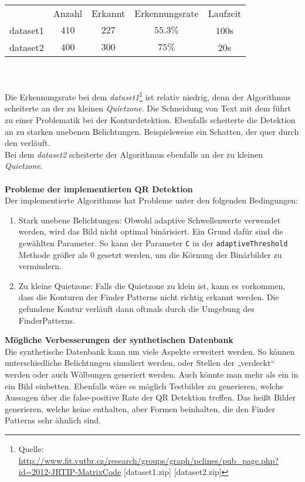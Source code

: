 \begin{tabular}{l c c c c}
 		& Anzahl & Erkannt & Erkennungsrate & Laufzeit \\
		dataset1 & $410$ & $227$ & $55.3\%$ & $100$s \\
		dataset2 & $400$ & $300$ & $75\%$ & $20$s \\
\end{tabular}
\\ \\
Die Erkennungsrate bei dem \emph{dataset1}\footnote{Quelle: \url{http://www.fit.vutbr.cz/research/groups/graph/pclines/pub_page.php?id=2012-JRTIP-MatrixCode} [dataset1.zip] [dataset2.zip]} ist relativ niedrig, denn der Algorithmus scheiterte an der zu kleinen  \emph{Quietzone}.
Die Schneidung von Text mit dem \QRCode führt zu einer Problematik bei der Konturdetektion. Ebenfalls scheiterte die Detektion an zu starken unebenen Belichtungen. Beispielsweise ein Schatten, der quer durch den \QRCode verläuft.\\
Bei dem \emph{dataset2} scheiterte der Algorithmus ebenfalls an der zu kleinen \emph{Quietzone}. \\ 
\\
\textbf{Probleme der implementierten QR Detektion} \\
Der implementierte Algorithmus hat Probleme unter den folgenden Bedingungen:
\begin{enumerate}
\item Stark unebene Belichtungen: Obwohl adaptive Schwellenwerte verwendet werden, wird das Bild nicht optimal binärisiert. Ein Grund dafür sind die
	gewählten Parameter. So kann der Parameter \texttt{C} in der \texttt{adaptiveThreshold} Methode größer als $0$ gesetzt werden,
	um die Körnung der Binärbilder zu vermindern.

\item Zu kleine Quietzone: Falls die Quietzone zu klein ist, kann es vorkommen, dass die Konturen der Finder Patterns nicht richtig erkannt werden. Die gefundene Kontur verläuft dann oftmals durch die Umgebung des FinderPatterns. \\
\end{enumerate}

\textbf{Mögliche Verbesserungen der synthetischen Datenbank}\\
Die synthetische Datenbank kann um viele Aspekte erweitert werden. So können unterschiedliche Belichtungen simuliert werden, oder Stellen der \QRCodes „verdeckt“ werden oder auch Wölbungen generiert werden. Auch könnte man mehr als ein \QRCode in ein Bild einbetten.
Ebenfalls wäre es möglich Testbilder zu generieren, welche Aussagen über die false-positive Rate der QR Detektion treffen. Das heißt Bilder generieren, welche keine \QRCodes enthalten, aber Formen beinhalten, die den Finder Patterns sehr ähnlich sind.

